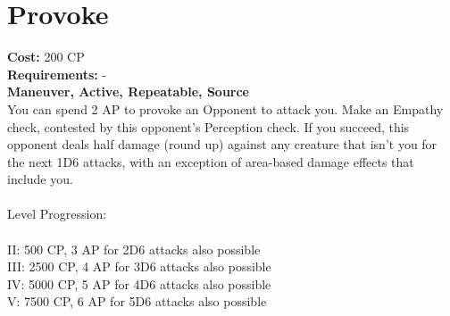 \section{Provoke}
\textbf{Cost:} 200 CP\\
\textbf{Requirements:} -\\
\textbf{Maneuver, Active, Repeatable, Source}\\
You can spend 2 AP to provoke an Opponent to attack you. Make an Empathy check, contested by this opponent’s Perception check. If you succeed, this opponent deals half damage (round up) against any creature that isn’t you for the next 1D6 attacks, with an exception of area-based damage effects that include you.\\
\\
Level Progression:\\
\\
II: 500 CP, 3 AP for 2D6 attacks also possible\\
III: 2500 CP, 4 AP for 3D6 attacks also possible\\
IV: 5000 CP, 5 AP for 4D6 attacks also possible\\
V: 7500 CP, 6 AP for 5D6 attacks also possible\\
